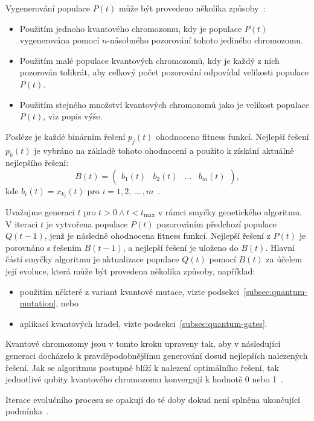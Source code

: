 Vygenerování populace $P(t)$ může být provedeno několika způsoby~\cite{NaturalComputing}:
\begin{itemize}
    \item Použitím jednoho kvantového chromozomu, kdy je populace $P(t)$ vygenerována pomocí $n$-násobného pozorování tohoto jediného chromozomu. 
    \item Použitím malé populace kvantových chromozomů, kdy je každý z nich pozorován tolikrát, aby celkový počet pozorování odpovídal velikosti populace $P(t)$.
    \item Použitím stejného množství kvantových chromozomů jako je velikost populace $P(t)$, viz popis výše.
\end{itemize}

Posléze je každé binárním řešení $p_j(t)$ ohodnoceno fitness funkcí. 
Nejlepší řešení $p_k(t)$ je vybráno na základě tohoto ohodnocení a použito k získání aktuálně nejlepšího řešení:
\begin{equation*}
    B(t) =
    \begin{pmatrix}
        b_1(t) & b_2(t) & \dots & b_m(t)
    \end{pmatrix},
\end{equation*}
kde $b_i(t) = x_{k_i}(t)$ pro $i = 1,2,\,\dots\,,m$~\cite{NaturalComputing,qiga}.

Uvažujme generaci $t$ pro $t>0 \wedge t<t_{\text{max}}$ v rámci smyčky genetického algoritmu. 
V iteraci $t$ je vytvořena populace $P(t)$ pozorováním předchozí populace $Q(t-1)$, jenž je následně ohodnocena fitness funkcí. 
Nejlepší řešení z $P(t)$ je porovnáno s řešením $B(t-1)$, a nejlepší řešení je uloženo do $B(t)$. 
Hlavní částí smyčky algoritmu je aktualizace populace $Q(t)$ pomocí $B(t)$ za účelem její evoluce, která může být provedena několika způsoby, například:
\begin{itemize}
    \item použitím některé z variant kvantové mutace, vizte podsekci~\ref{subsec:quantum-mutation}, nebo
    \item aplikací kvantových hradel, vizte podsekci~\ref{subsec:quantum-gates}.
\end{itemize}
Kvantové chromozomy jsou v tomto kroku upraveny tak, aby v následující generaci docházelo k pravděpodobnějšímu generování dosud nejlepších nalezených řešení. 
Jak se algoritmus postupně blíží k nalezení optimálního řešení, tak jednotlivé qubity kvantového chromozomu konvergují k hodnotě 0 nebo 1~\cite{NaturalComputing,qiga}.

Iterace evolučního procesu se opakují do té doby dokud není splněna ukončující podmínka~\cite{NaturalComputing,qiga}.

